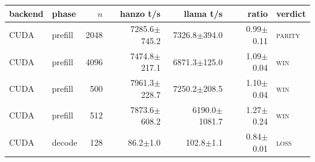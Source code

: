 \begin{tabular}{@{}llrrrrl@{}}
\toprule
backend & phase & $n$ & hanzo t/s & llama t/s & ratio & verdict \\
\midrule
CUDA & prefill & 2048 & 7285.6$\pm$745.2 & 7326.8$\pm$394.0 & 0.99$\pm$0.11 & \textsc{parity} \\
CUDA & prefill & 4096 & 7474.8$\pm$217.1 & 6871.3$\pm$125.0 & 1.09$\pm$0.04 & \textsc{win} \\
CUDA & prefill & 500 & 7961.3$\pm$228.7 & 7250.2$\pm$208.5 & 1.10$\pm$0.04 & \textsc{win} \\
CUDA & prefill & 512 & 7873.6$\pm$608.2 & 6190.0$\pm$1081.7 & 1.27$\pm$0.24 & \textsc{win} \\
CUDA & decode & 128 & 86.2$\pm$1.0 & 102.8$\pm$1.1 & 0.84$\pm$0.01 & \textsc{loss} \\
\bottomrule
\end{tabular}
